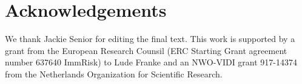 \section*{Acknowledgements}
We thank Jackie Senior for editing the final text. This work is supported by a grant from the European Research Counsil (ERC Starting Grant agreement number 637640 ImmRisk) to Lude Franke and an NWO-VIDI grant 917-14374 from the Netherlands Organization for Scientific Research. 


